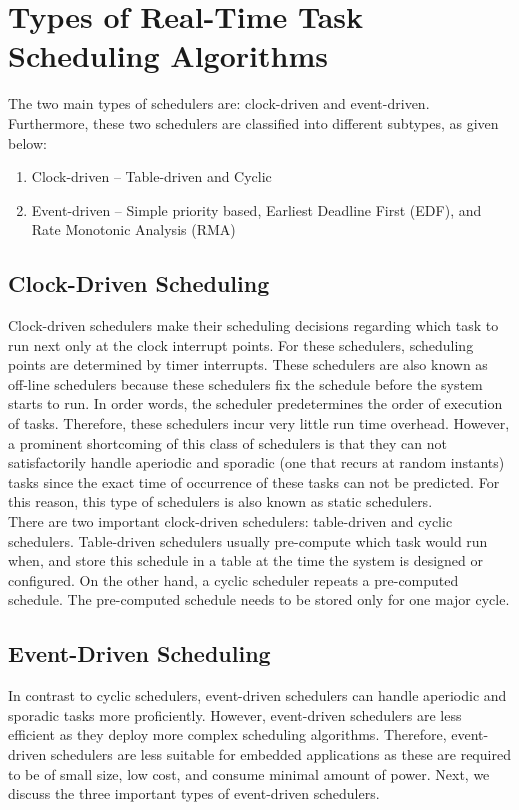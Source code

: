 \documentclass[12pt]{report}
\begin{document}
\section{Types of Real-Time Task Scheduling Algorithms}
The two main types of schedulers are: clock-driven and event-driven. Furthermore, these two schedulers are classified into different subtypes, as given below:
\begin{enumerate}
    \setlength\itemsep{-0.2em}
    \item Clock-driven -- Table-driven and Cyclic
    \item Event-driven -- Simple priority based, Earliest Deadline First (EDF), and Rate Monotonic Analysis (RMA) 
\end{enumerate}

\subsection{Clock-Driven Scheduling}
Clock-driven schedulers make their scheduling decisions regarding which task to run next only at the clock interrupt points. For these schedulers, scheduling points are determined by timer interrupts. These schedulers are also known as off-line schedulers because these schedulers fix the schedule before the system starts to run. In order words, the scheduler predetermines the order of execution of tasks. Therefore, these schedulers incur very little run time overhead. However, a prominent shortcoming of this class of schedulers is that they can not satisfactorily handle aperiodic and sporadic (one that recurs at random instants) tasks since the exact time of occurrence of these tasks can not be predicted. For this reason, this type of schedulers is also known as static schedulers.  \\

There are two important clock-driven schedulers: table-driven and cyclic schedulers. Table-driven schedulers usually pre-compute which task would run when, and store this schedule in a table at the time the system is designed or configured. On the other hand, a cyclic scheduler repeats a pre-computed schedule. The pre-computed schedule needs to be stored only for one major cycle. 

\subsection{Event-Driven Scheduling}
In contrast to cyclic schedulers, event-driven schedulers can handle aperiodic and sporadic tasks more proficiently. However, event-driven schedulers are less efficient as they deploy more complex scheduling algorithms. Therefore, event-driven schedulers are less suitable for embedded applications as these are required to be of small size, low cost, and consume minimal amount of power. Next, we discuss the three important types of event-driven schedulers.\\
\end{document}
